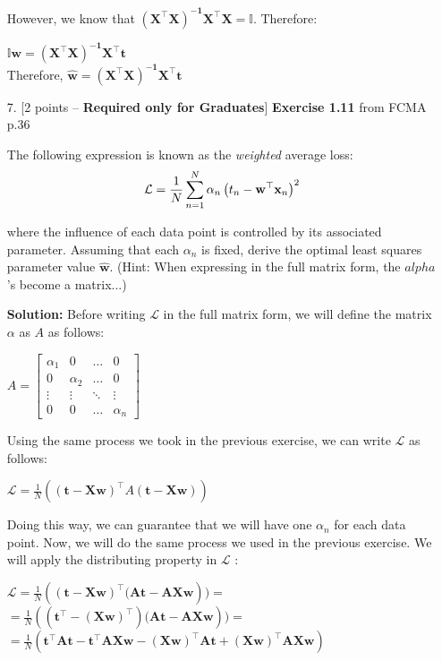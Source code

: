 \documentclass[10pt]{article}
\begin{document}
\begin{itemize}
However, we know that $\mathbf{(X^{\top}X)^{-1} X^{\top}X} = \mathbb{I} $. Therefore:

$\mathbf{\mathbb{I}w = (X^{\top}X)^{-1} X^{\top}t} $ \\ [0.5 cm]

Therefore, $\mathbf{\hat{w}} = \mathbf{(X^{\top}X)^{-1} X^{\top}t} $





\item[7.] [2 points -- {\bf Required only for Graduates}]
{\bf Exercise 1.11} from FCMA p.36

The following expression is known as the {\em weighted} average loss:
\begin{eqnarray*}
\mathcal{L} = {1 \over N} \sum_{n=1}^N \alpha_n \left( t_n - \mathbf{w}^\top \mathbf{x}_n \right)^2
\end{eqnarray*}

where the influence of each data point is controlled by its associated parameter.  Assuming that each $\alpha_n$ is fixed, derive the optimal least squares parameter value $\mathbf{\hat{w}}$.  (Hint: When expressing in the full matrix form, the $alpha$'s become a matrix...)

{\bf Solution:} Before writing $\mathcal{L}$ in the full matrix form, we will define the matrix $\alpha$ as $A$ as follows:

$A = 
\begin{bmatrix}
\alpha_{1} &  0  & \ldots & 0\\
0  &  \alpha_{2} & \ldots & 0\\
\vdots & \vdots & \ddots & \vdots\\
0  &   0       &\ldots &\alpha_{n}
\end{bmatrix}
$

Using the same process we took in the previous exercise, we can write $\mathcal{L}$ as follows:

$\mathcal{L} = \frac{1}{N}((\mathbf{t - Xw})^\top A(\mathbf{t - Xw}))$

Doing this way, we can guarantee that we will have one $\alpha_{n}$ for each data point. Now, we will do the same process 
we used in the previous exercise. We will apply the distributing property in $\mathcal{L}$ :

$\mathcal{L} = \frac{1}{N}(\mathbf{(t - Xw)^{\top} (At - AXw})) = $ \\
$= \frac{1}{N}(\mathbf{(t^{\top} - (Xw)^{\top}) (At - AXw})) =$ \\
$= \frac{1}{N}(\mathbf{t^{\top}At - t^{\top}AXw - (Xw)^{\top}At + (Xw)^{\top}AXw}) $ \\


\end{itemize}
\end{document}
